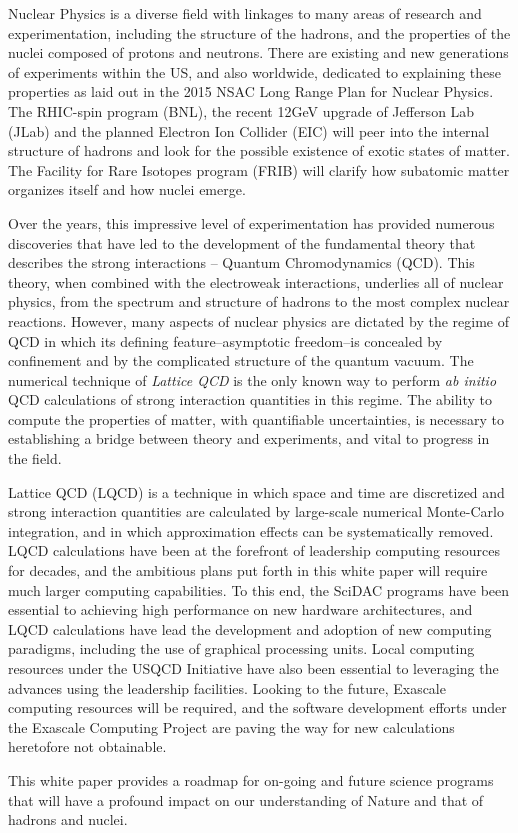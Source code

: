 
Nuclear Physics is a diverse field with linkages to many areas of
research and experimentation, including the structure of the hadrons,
and the properties of the nuclei composed of protons and neutrons.
There are existing and new generations of experiments within the US,
and also worldwide, dedicated to explaining these properties as laid
out in the 2015 NSAC Long Range Plan for Nuclear Physics.  The
RHIC-spin program (BNL), the recent
12GeV upgrade of Jefferson Lab (JLab) and the planned Electron Ion
Collider (EIC) will peer into the internal structure of hadrons and
look for the possible existence of exotic states of matter. The
Facility for Rare Isotopes program (FRIB) will clarify how subatomic
matter organizes itself and how nuclei emerge.

Over the years, this impressive level of experimentation has provided
numerous discoveries that have led to the development of the
fundamental theory that describes the strong interactions -- Quantum
Chromodynamics (QCD). This theory, when combined with the electroweak
interactions, underlies all of nuclear physics, from the spectrum and
structure of hadrons to the most complex nuclear reactions. However,
many aspects of nuclear physics are dictated by the regime of QCD in
which its defining feature--asymptotic freedom--is concealed by
confinement and by the complicated structure of the quantum
vacuum. The numerical technique of {\it Lattice QCD} is the only known
way to perform {\it ab initio} QCD calculations of strong interaction
quantities in this regime. The ability to compute the properties of
matter, with quantifiable uncertainties, is necessary to establishing
a bridge between theory and experiments, and vital to progress in the
field.  

Lattice QCD (LQCD) is a technique in which space and time are
discretized and strong interaction quantities are calculated by
large-scale numerical Monte-Carlo integration, and in which
approximation effects can be systematically removed. LQCD calculations
have been at the forefront of leadership computing resources for
decades, and the ambitious plans put forth in this white paper will
require much larger computing capabilities. To this end, the SciDAC
programs have been essential to achieving high performance on new hardware
architectures, and LQCD calculations have lead the development and
adoption of new computing paradigms, including the use of graphical
processing units. Local computing resources under the USQCD Initiative
have also been essential to leveraging the advances using the
leadership facilities. Looking to the future, Exascale computing resources
will be required, and the software development efforts under the
Exascale Computing Project are paving the way for new calculations
heretofore not obtainable.


This white paper provides a roadmap for on-going and future science
programs that will have a profound impact on our understanding of Nature and
that of hadrons and nuclei.

